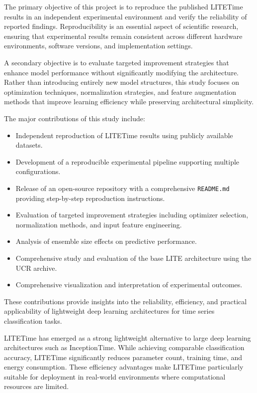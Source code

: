 \documentclass[conference]{IEEEtran}
\begin{document}
The primary objective of this project is to reproduce the published LITETime results in an independent experimental environment and verify the reliability of reported findings. Reproducibility is an essential aspect of scientific research, ensuring that experimental results remain consistent across different hardware environments, software versions, and implementation settings.

A secondary objective is to evaluate targeted improvement strategies that enhance model performance without significantly modifying the architecture. Rather than introducing entirely new model structures, this study focuses on optimization techniques, normalization strategies, and feature augmentation methods that improve learning efficiency while preserving architectural simplicity.

The major contributions of this study include:

\begin{itemize}

    \item Independent reproduction of LITETime results using publicly available datasets.
    \item Development of a reproducible experimental pipeline supporting multiple configurations.
    \item Release of an open-source repository with a comprehensive \texttt{README.md} providing step-by-step reproduction instructions.
    \item Evaluation of targeted improvement strategies including optimizer selection, normalization methods, and input feature engineering.
    \item Analysis of ensemble size effects on predictive performance.
    \item Comprehensive study and evaluation of the base LITE architecture using the UCR archive.
    \item Comprehensive visualization and interpretation of experimental outcomes.

\end{itemize}

These contributions provide insights into the reliability, efficiency, and practical applicability of lightweight deep learning architectures for time series classification tasks.

LITETime has emerged as a strong lightweight alternative to large deep learning architectures such as InceptionTime. While achieving comparable classification accuracy, LITETime significantly reduces parameter count, training time, and energy consumption. These efficiency advantages make LITETime particularly suitable for deployment in real-world environments where computational resources are limited.
\end{document}
